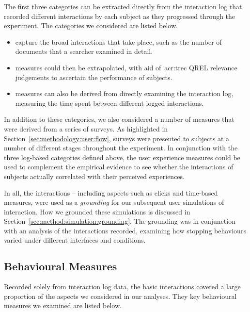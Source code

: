 The first three categories can be extracted directly from the interaction log that recorded different interactions by each subject as they progressed through the experiment. The categories we considered are listed below.

\begin{itemize}
    
    \item{ capture the broad interactions that take place, such as the number of documents that a searcher examined in detail.}
    \item{ measures could then be extrapolated, with aid of~\gls{acr:trec} QREL relevance judgements to ascertain the performance of subjects.}
    \item{ measures can also be derived from directly examining the interaction log, measuring the time spent between different logged interactions.}
    
\end{itemize}

In addition to these categories, we also considered a number of  measures that were derived from a series of surveys. As highlighted in Section~\ref{sec:methodology:user:flow}, surveys were presented to subjects at a number of different stages throughout the experiment. In conjunction with the three log-based categories defined above, the user experience measures could be used to complement the empirical evidence to see whether the interactions of subjects actually correlated with their perceived experiences.

In all, the interactions -- including aspects such as clicks and time-based measures, were used as a \emph{grounding} for our subsequent user simulations of interaction. How we grounded these simulations is discussed in Section~\ref{sec:method:simulation:grounding}. The grounding was in conjunction with an analysis of the interactions recorded, examining how stopping behaviours varied under different interfaces and conditions. 

\vspace*{-3mm}
\subsection{Behavioural Measures}
Recorded solely from interaction log data, the basic interactions covered a large proportion of the aspects we considered in our analyses. They key behavioural measures we examined are listed below.

